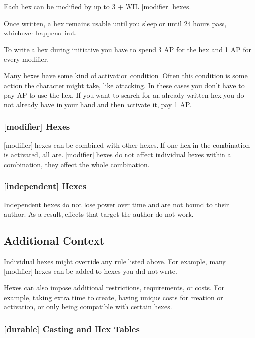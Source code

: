 \documentclass[
  letterpaper,
  DIV=11,
  numbers=noendperiod]{scrartcl}
\begin{document}
Each hex can be modified by up to 3 + WIL {[}modifier{]} hexes.

Once written, a hex remains usable until you sleep or until 24 hours
pass, whichever happens first.

To write a hex during initiative you have to spend 3 AP for the hex and
1 AP for every modifier.

Many hexes have some kind of activation condition. Often this condition
is some action the character might take, like attacking. In these cases
you don't have to pay AP to use the hex. If you want to search for an
already written hex you do not already have in your hand and then
activate it, pay 1 AP.

\subsubsection{{[}modifier{]} Hexes}\label{modifier-hexes}

{[}modifier{]} hexes can be combined with other hexes. If one hex in the
combination is activated, all are. {[}modifier{]} hexes do not affect
individual hexes within a combination, they affect the whole
combination.

\subsubsection{{[}independent{]} Hexes}\label{independent-hexes}

Independent hexes do not lose power over time and are not bound to their
author. As a result, effects that target the author do not work.

\subsection{Additional Context}\label{additional-context}

Individual hexes might override any rule listed above. For example, many
{[}modifier{]} hexes can be added to hexes you did not write.

Hexes can also impose additional restrictions, requirements, or costs.
For example, taking extra time to create, having unique costs for
creation or activation, or only being compatible with certain hexes.

\subsubsection{{[}durable{]} Casting and Hex
Tables}\label{durable-casting-and-hex-tables}
\end{document}
